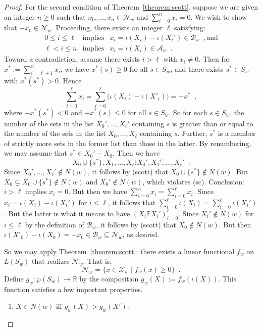 \documentclass[12pt]{article}
\theoremstyle{definition}
\begin{document}
\begin{proof}
  For the second condition of Theorem~\ref{theorem:scott}, suppose we
  are given an integer $n\geq 0$ such that
  $x_0,\dots,x_n\in\mathcal{N}_w$ and $\sum_{i=0}^n x_i=0$.  We
  wish to show that $-x_0\in\mathcal{N}_w$.  Proceeding, there
  exists an integer $\ell$ satisfying:
  \begin{eqnarray*}
    0\leq i\leq\ell & \text{implies} &
    x_i=\iota(X_i)-\iota(X_i')\in\mathcal{B}_w 
    \enspace,\text{and}
    \\
    \ell<i\leq n & \text{implies} &
    x_i=\iota(X_i)\in\mathcal{A}_w \enspace.
  \end{eqnarray*}
  Toward a contradiction, assume there exists $i>\ell$ with $x_i\neq
  0$.  Then for $x^*:=\sum_{i=\ell+1}^n x_i$, we have $x^*(s)\geq 0$
  for all $s\in S_w$, and there exists $s^*\in S_w$ with
  $x^*(s^*)>0$. Hence
  \[
  \textstyle \sum_{i=0}^\ell x_i=
  \sum_{i=0}^\ell\bigl(\iota(X_i)-\iota(X'_i)\bigr)=-x^*\enspace,
  \]
  where $-x^*(s^*)<0$ and $-x^*(s)\leq 0$ for all $s\in S_w$.  So for
  each $s\in S_w$, the number of the sets in the list
  $X_0',\dots,X_\ell'$ containing $s$ is greater than or equal to the
  number of the sets in the list $X_0,\dots,X_\ell$ containing $s$.
  Further, $s^*$ is a member of strictly more sets in the former list
  than those in the latter.  By renumbering, we may assume that
  $s^*\in X_0'-X_0$.  Then we have
  \[
  X_0\cup\{s^*\},X_1,\dots,X_\ell \mathbb{I}
  X_0',X_1',\dots,X_\ell'\enspace.
  \]
  Since $X_0',\dots,X_\ell'\notin N(w)$, it follows by (scott) that
  $X_0\cup\{s^*\}\notin N(w)$.  But $X_0\subsetneq
  X_0\cup\{s^*\}\notin N(w)$ and $X_0'\notin N(w)$, which violates
  (sc).  Conclusion: $i>\ell$ implies $x_i=0$.  But then we have
  $\sum_{i=0}^n x_i=\sum_{i=0}^\ell x_i$.  Since
  $x_i=\iota(X_i)-\iota(X_i')$ for $i\leq\ell$, it follows that
  $\sum_{i=0}^\ell\iota(X_i)=\sum_{i=0}^\ell\iota(X_i')$. But the
  latter is what it means to have $(X_i\mathbb{E}X_i')_{i=0}^\ell$.
  Since $X_i'\notin N(w)$ for $i\leq\ell$ by the definition of
  $\mathcal{B}_w$, it follows by (scott) that $X_0\notin N(w)$.
  But then $\iota(X'_0)-\iota(X_0)=-x_0\in\mathcal{B}_w \subseteq
  \mathcal{N}_w$, as desired.

  So we may apply Theorem~\ref{theorem:scott}: there exists a linear
  functional $f_w$ on $L(S_w)$ that realizes
  $\mathcal{N}_w$.  That is,
  \[
  \mathcal{N}_w=\{x\in\mathcal{X}_w\mid f_w(x)\geq
  0\}\enspace.
  \]
  Define $g_w:\wp(S_w)\to\mathbb{R}$ by the composition
  $g_w(X):=f_w(\iota(X))$.  This function satisfies a few
  important properties.
  \begin{enumerate}
  \item \label{prop:XinN} $X\in N(w)$ iff $g_w(X)>g_w(X')$.


\end{enumerate}
\end{proof}
\end{document}
